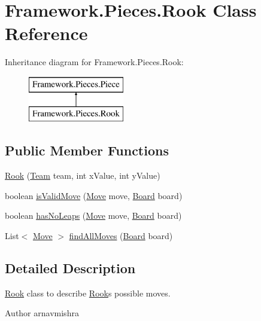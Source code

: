 \hypertarget{class_framework_1_1_pieces_1_1_rook}{}\section{Framework.\+Pieces.\+Rook Class Reference}
\label{class_framework_1_1_pieces_1_1_rook}
Inheritance diagram for Framework.\+Pieces.\+Rook\+:\begin{figure}[H]
\begin{center}
\leavevmode
\includegraphics[height=2.000000cm]{class_framework_1_1_pieces_1_1_rook}
\end{center}
\end{figure}
\subsection*{Public Member Functions}
\begin{DoxyCompactItemize}
\item 
\hyperlink{class_framework_1_1_pieces_1_1_rook_a537a1bad0e427c7891e87bb0393867cb}{Rook} (\hyperlink{class_framework_1_1_team}{Team} team, int x\+Value, int y\+Value)
\item 
boolean \hyperlink{class_framework_1_1_pieces_1_1_rook_a9926099ab216a54a6e441ad198aa611f}{is\+Valid\+Move} (\hyperlink{class_framework_1_1_move}{Move} move, \hyperlink{class_framework_1_1_board}{Board} board)
\item 
boolean \hyperlink{class_framework_1_1_pieces_1_1_rook_a6094de0cab95254ff4bcedd3b35d2079}{has\+No\+Leaps} (\hyperlink{class_framework_1_1_move}{Move} move, \hyperlink{class_framework_1_1_board}{Board} board)
\item 
List$<$ \hyperlink{class_framework_1_1_move}{Move} $>$ \hyperlink{class_framework_1_1_pieces_1_1_rook_a1733e5f2d272bfe4a7db8f0cb2606c5d}{find\+All\+Moves} (\hyperlink{class_framework_1_1_board}{Board} board)
\end{DoxyCompactItemize}


\subsection{Detailed Description}
\hyperlink{class_framework_1_1_pieces_1_1_rook}{Rook} class to describe \hyperlink{class_framework_1_1_pieces_1_1_rook}{Rook}\textquotesingle{}s possible moves. \begin{DoxyAuthor}{Author}
arnavmishra 
\end{DoxyAuthor}


